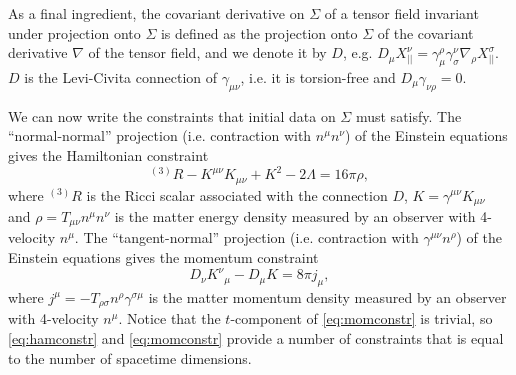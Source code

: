\documentclass[a4paper,11pt]{article}
\numberwithin{equation}{section}
\begin{document}
As a final ingredient, the covariant derivative on $\Sigma$ of a tensor field invariant under projection onto $\Sigma$ is defined as the projection onto $\Sigma$ of the covariant derivative $\nabla$ of the tensor field, and we denote it by $D$, e.g. $D_\mu X_{||}^\nu=\gamma^\rho_\mu \gamma^\nu_\sigma \nabla_\rho X_{||}^\sigma$. $D$ is the Levi-Civita connection of $\gamma_{\mu\nu}$, i.e. it is torsion-free and $D_\mu\gamma_{\nu\rho}=0$.

We can now write the constraints that initial data on $\Sigma$ must satisfy. The ``normal-normal'' projection (i.e. contraction with $n^\mu n^\nu$) of the Einstein equations gives the Hamiltonian constraint
\begin{equation}
\label{eq:hamconstr}
^{(3)}R-K^{\mu\nu}K_{\mu\nu}+K^2-2\Lambda=16\pi\rho,
\end{equation}
where $^{(3)}R$ is the Ricci scalar associated with the connection $D$, $K=\gamma^{\mu\nu}K_{\mu\nu}$ and $\rho=T_{\mu\nu}n^\mu n^\nu$ is the matter energy density measured by an observer with 4-velocity $n^\mu$.
The ``tangent-normal'' projection (i.e. contraction with $\gamma^{\mu\nu} n^\rho$) of the Einstein equations gives the momentum constraint
\begin{equation}
\label{eq:momconstr}
D_\nu {K^\nu}_\mu-D_\mu K=8\pi j_\mu,
\end{equation}
where $j^\mu=-T_{\rho\sigma}n^\rho\gamma^{\sigma\mu}$ is the matter momentum density measured by an observer with 4-velocity $n^\mu$. Notice that the $t$-component of \eqref{eq:momconstr} is trivial, so \eqref{eq:hamconstr} and \eqref{eq:momconstr} provide a number of constraints that is equal to the number of spacetime dimensions.
\end{document}
